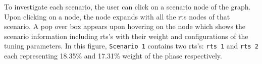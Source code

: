 To investigate each scenario, the user can click on a scenario node of the graph. Upon clicking on a node, the node expands with all the rts nodes of that scenario. A pop over box appears upon hovering on the node which shows the scenario information including rts's with their weight and configurations of the tuning parameters. In this figure, \texttt{Scenario~1} contains two rts's: \texttt{rts 1} and \texttt{rts 2} each representing 18.35\% and 17.31\% weight of the phase respectively.